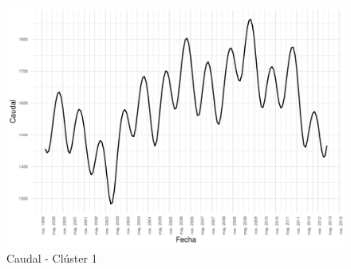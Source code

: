 \documentclass[12pt,oneside]{book}\usepackage[]{graphicx}\usepackage[]{color}
\makeatletter
\def\maxwidth{ %
  \ifdim\Gin@nat@width>\linewidth
    \linewidth
  \else
    \Gin@nat@width
  \fi
}
\newenvironment{knitrout}{}{} %
\theoremstyle{definition} %
\makeatother
\begin{document}



% 


% 
% 
% 











\begin{knitrout}
\color{fgcolor}\begin{figure}[H]

{\centering \includegraphics[width=\maxwidth]{figure/unnamed-chunk-7-1} 

}

\caption{\label{fig:sarima_serie} Caudal - Clúster 1}\label{fig:unnamed-chunk-7}
\end{figure}


\end{knitrout}
\end{document}
